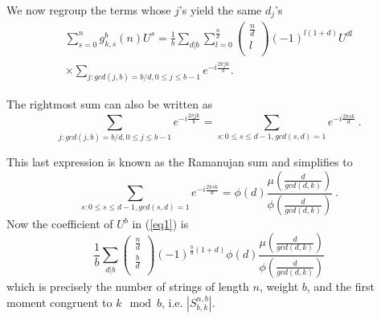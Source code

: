 We now regroup the terms whose $j$'s yield the same $d_j$'s
\begin{eqnarray*}
\sum_{s=0}^n g^b_{k,s}(n)U^s=\frac{1}{b}\sum_{d|b}
\sum_{l=0}^{\frac{n}{d}} \left(
\begin{array}{c}
                             \frac{n}{d} \\
                             l \\
                           \end{array}
                           \right)(-1)^{l(1+d)}U^{d l}\\ \times
\sum_{j: gcd(j,b)=b/d, 0 \leq j\leq b-1}e^{-i\frac{2\pi
                           j k}{b}}.
\end{eqnarray*}

The rightmost sum can also be written as
\begin{equation}
\sum_{j:gcd(j,b)=b/d, 0 \leq j\leq b-1}e^{-i\frac{2\pi
                           j k}{b}}= \sum_{s:0 \leq s\leq d-1,gcd(s,d)=1}
e^{-i\frac{2\pi
                           s k}{d}}~.
\end{equation}


This last expression is known as the Ramanujan sum \cite{apostol}
and simplifies to \begin{equation}\sum_{s:0 \leq s\leq
d-1,gcd(s,d)=1}e^{-i\frac{2\pi
                           s k}{d}}=\phi(d)
\frac{\mu\left(\frac{d}{gcd(d,k)}\right)}{\phi\left(\frac{d}{gcd(d,k)}\right)}~.
                           \end{equation}
Now the coefficient of $U^b$ in (\ref{eq1}) is
\begin{equation}\label{eq2}
\frac{1}{b} \sum_{d|b} \left( \begin{array}{c}
                             \frac{n}{d} \\
                             \frac{b}{d} \\
                           \end{array} \right)(-1)^{\frac{b}{d}(1+d)}\phi(d) \frac{\mu\left(\frac{d}{gcd(d,k)}\right)}{\phi\left(\frac{d}{gcd(d,k)}\right)}
\end{equation}
which is precisely the number of strings of length $n$, weight $b$,
and the first moment congruent to $k \mod b$, i.e.
$|S_{b,k}^{n,b}|$.

